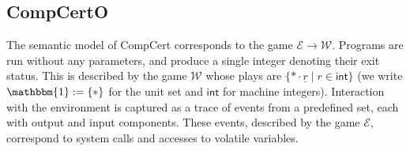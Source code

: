 \documentclass[acmsmall,authordraft]{acmart}
\newcommand{\kw}[1]{\ensuremath{ \mathsf{#1} }}
\begin{document}


%
%
%
%
%

\subsection{CompCertO} \label{sec:mainideas:compcerto} %

The semantic model of CompCert corresponds to
the game $\mathcal{E} \rightarrow \mathcal{W}$.
Programs are run without any parameters,
and produce a single integer denoting their exit status.
This is described by the game $\mathcal{W}$
whose plays are $\{ * \cdot \underline{r} \mid r \in \kw{int} \}$
(we write $\mathbbm{1} := \{ * \}$ for the unit set
and $\kw{int}$ for machine integers).
Interaction with the environment
is captured as a trace of events from a predefined set,
each with output and input components.
These events,
described by the game $\mathcal{E}$,
correspond to system calls and accesses to volatile variables.
\end{document}
